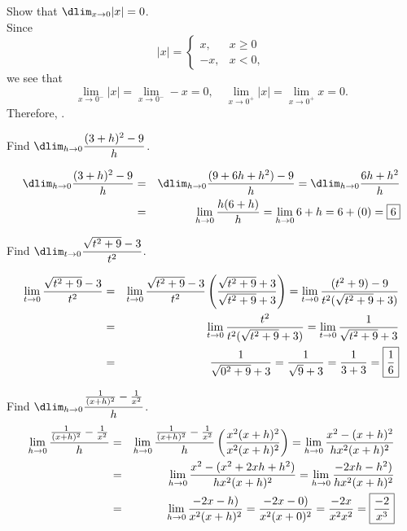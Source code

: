\documentclass{book}
\begin{document}
\begin{Exam} Show that $\dlim_{x\to 0} |x| = 0$.\\

Since \[|x| = \left\{\begin{array}{ll} x, & x\ge 0\\ -x, & x < 0,\end{array}\right.\] we see that \[\lim_{x\to 0^-} |x| = \lim_{x\to 0^-}  -x = 0,\quad  \lim_{x\to 0^+} |x| = \lim_{x\to 0^+} x = 0. \] Therefore, .
\end{Exam}\vs 

\begin{Exam} Find $\dlim_{h\to 0} \dfrac{(3+h)^2-9}{h}$.

\begin{eqnarray*}
\dlim_{h\to 0} \dfrac{(3+h)^2-9}{h} &=& \dlim_{h\to 0} \dfrac{(9+6h+h^2)-9}{h} = \dlim_{h\to 0} \dfrac{6h+h^2}{h}\\
&=& \lim_{h\to 0} \dfrac{h(6+h)}{h} = \lim_{h\to 0} 6+h = 6+(0) = \fbox{$6$}
\end{eqnarray*}
\end{Exam}\vs


\begin{Exam} Find $\dlim_{t\to 0} \dfrac{\sqrt{t^2+9}-3}{t^2}$.

\begin{eqnarray*}
\lim_{t\to 0} \dfrac{\sqrt{t^2+9}-3}{t^2} &=& \lim_{t\to 0} \dfrac{\sqrt{t^2+9}-3}{t^2}\left(\dfrac{\sqrt{t^2+9}+3}{\sqrt{t^2+9}+3}\right) = \lim_{t\to 0} \dfrac{(t^2+9)-9}{t^2(\sqrt{t^2+9}+3)}\\
&=&  \lim_{t\to 0} \dfrac{t^2}{t^2(\sqrt{t^2+9}+3)} =  \lim_{t\to 0} \dfrac{1}{\sqrt{t^2+9}+3}\\
&=&  \dfrac{1}{\sqrt{0^2+9}+3} =  \dfrac{1}{\sqrt{9}+3} =  \dfrac{1}{3+3} =  \fbox{$\dfrac{1}{6}$}
\end{eqnarray*}
\end{Exam}\vs

\begin{Exam} Find $\dlim_{h\to 0} \dfrac{\frac{1}{(x+h)^2} - \frac{1}{x^2}}{h}$.\\

\begin{eqnarray*}
\lim_{h\to 0} \dfrac{\frac{1}{(x+h)^2} - \frac{1}{x^2}}{h} &=& \lim_{h\to 0} \dfrac{\frac{1}{(x+h)^2} - \frac{1}{x^2}}{h}\left(\dfrac{x^2(x+h)^2}{x^2(x+h)^2}\right) =\lim_{h\to 0} \dfrac{x^2 - (x+h)^2}{hx^2(x+h)^2}\\
&=& \lim_{h\to 0} \dfrac{x^2 - (x^2+2xh+h^2)}{hx^2(x+h)^2} = \lim_{h\to 0} \dfrac{-2xh-h^2)}{hx^2(x+h)^2}\\
&=& \lim_{h\to 0} \dfrac{-2x-h)}{x^2(x+h)^2} = \dfrac{-2x-0)}{x^2(x+0)^2} = \dfrac{-2x}{x^2x^2} = \fbox{$\dfrac{-2}{x^3}$} 
\end{eqnarray*}
\end{Exam}\vs
\end{document}
